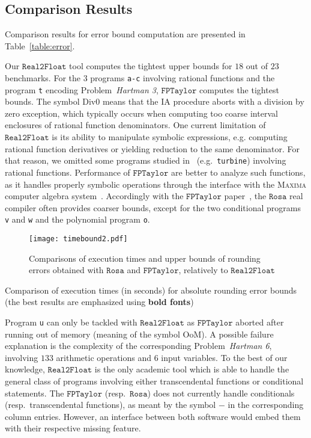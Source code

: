 \documentclass[preprint]{sigplanconf}
\newcommand{\code}[1]{\lstinline{#1}}
\newcommand{\nbenchs}{23}
\newcommand{\divzero}{\text{Div0}}
\newcommand{\realtofloat}{\mathtt{Real2Float}}
\newcommand{\rosa}{\mathtt{Rosa}}
\newcommand{\fptaylor}{\mathtt{FPTaylor}}
\theoremstyle{plain}
\begin{document}
\subsection{Comparison Results}
%
Comparison results for error bound computation are presented in Table~\ref{table:error}. 

Our $\realtofloat$ tool computes the tightest upper bounds for $18$ out of $\nbenchs$ benchmarks. For the $3$ programs \code{a-c} involving rational functions and the program \code{t} encoding Problem~\textit{Hartman 3}, $\fptaylor$ computes the tightest bounds. The symbol $\divzero$ means that the IA procedure aborts with a division by zero exception, which typically occurs when computing too coarse interval enclosures of rational function denominators.
One current limitation of $\realtofloat$ is its ability to manipulate symbolic expressions, e.g. computing rational function derivatives or yielding reduction to the same denominator. For that reason, we omitted some programs studied in~\cite{fptaylor15} (e.g.~\code{turbine}) involving rational functions.
Performance of $\fptaylor$ are better to analyze such functions, as it handles properly symbolic operations through the interface with the \textsc{Maxima} computer algebra system~\cite{maxima}.
Accordingly with the $\fptaylor$ paper~\cite{fptaylor15}, the $\rosa$ real compiler often provides coarser bounds, except for the two conditional programs \code{v} and \code{w} and the polynomial program \code{o}.
%
\begin{figure}[!ht]
\begin{center}
\texttt{[image: timebound2.pdf]}
\caption{Comparisons of execution times and upper bounds of rounding errors obtained with $\rosa$ and $\fptaylor$, relatively to $\realtofloat$}\label{fig:timebound}
\end{center}
\end{figure}
%
\begin{table}[!ht]
\begin{center}
\caption{Comparison of execution times (in seconds) for absolute rounding error bounds (the best results are emphasized using \textbf{bold fonts})}

\label{table:cpu}
\end{center}
\end{table}
%
Program \code{u} can only be tackled with $\realtofloat$ as $\fptaylor$ aborted after running out of memory (meaning of the symbol OoM). A possible failure explanation is the complexity of the corresponding Problem~\textit{Hartman 6}, involving $133$ arithmetic operations and $6$ input variables.
To the best of our knowledge, $\realtofloat$ is the only academic tool which is able to handle the general class of programs involving either transcendental functions or conditional statements. The $\fptaylor$ (resp.~$\rosa$) does not currently handle conditionals (resp.~transcendental functions), as meant by the symbol $-$ in the corresponding column entries. However, an interface between both software would embed them with their respective missing feature.
\end{document}
